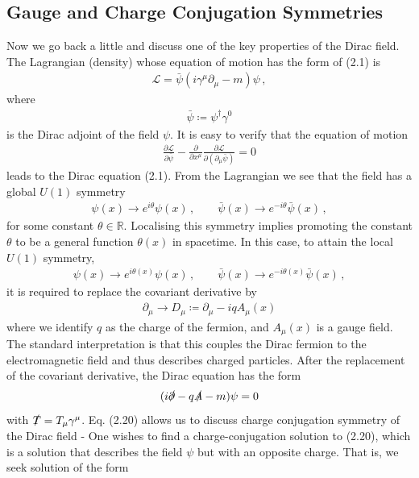 \documentclass[11pt, oneside]{book}
\theoremstyle{break}
\theoremstyle{break}
\newcommand{\R}{\mathbb{R}}
\newcommand{\pd}{\partial}
\begin{document}
\subsection{Gauge and Charge Conjugation Symmetries}
Now we go back a little and discuss one of the key properties of the Dirac field. The Lagrangian (density) whose equation of motion has the form of (2.1) is 
\begin{align}
\mathcal{L} = \bar{\psi}(i \gamma^\mu \pd_\mu - m) \psi\,,
\end{align}
where 
\begin{align}
\bar{\psi}\coloneqq \psi^\dagger \gamma^0
\end{align}
is the Dirac adjoint of the field $\psi$. It is easy to verify that the equation of motion 
\begin{align}
\frac{\pd \mathcal{L}}{\pd \bar{\psi}} - \frac{\pd}{\pd x^\mu}\frac{\pd \mathcal{L}}{\pd (\pd_\mu \bar{\psi})} = 0
\end{align}
leads to the Dirac equation (2.1). From the Lagrangian we see that the field has a global $U(1)$ symmetry 
\begin{align}
\psi(x) \to e^{i\theta}\psi(x) \,,\qquad
\bar{\psi}(x) \to e^{-i\theta}\bar{\psi}(x) \,,
\end{align}
for some constant $\theta \in \R$. Localising this symmetry implies promoting the constant $\theta$ to be a general function $\theta(x)$ in spacetime. In this case, to attain the local $U(1)$ symmetry,
\begin{align}
\psi(x) \to e^{i\theta(x)}\psi(x) \,,\qquad
\bar{\psi}(x) \to e^{-i\theta(x)}\bar{\psi}(x) \,,
\end{align}
it is required to replace the covariant derivative by
\begin{align}
\pd_\mu \to D_\mu\coloneqq \pd_\mu - iqA_\mu(x)
\end{align}
where we identify $q$ as the charge of the fermion, and $A_\mu(x)$ is a gauge field. The standard interpretation is that this couples the Dirac fermion to the electromagnetic field and thus describes charged particles. After the replacement of the covariant derivative, the Dirac equation has the form
\begin{align}
(i\slashed{\pd} - q\slashed{A} - m) \psi= 0
\end{align}
with $\slashed{T} = T_\mu \gamma^\mu$. Eq. (2.20) allows us to discuss charge conjugation symmetry of the Dirac field - One wishes to find a charge-conjugation solution to (2.20), which is a solution that describes the field $\psi$ but with an opposite charge. That is, we seek solution of the form
\end{document}

